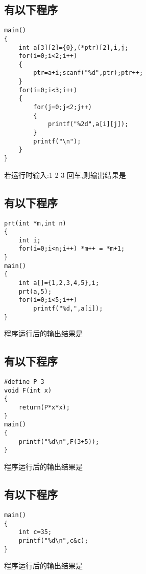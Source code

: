 ﻿\documentclass  [11pt,twocolumn]{article}
\begin{document}

\subsection{有以下程序}
\begin{lstlisting}
main() 
{ 
    int a[3][2]={0},(*ptr)[2],i,j; 
    for(i=0;i<2;i++) 
    {
        ptr=a+i;scanf("%d",ptr);ptr++;
    } 
    for(i=0;i<3;i++) 
    {
        for(j=0;j<2;j++)
        {
            printf("%2d",a[i][j]); 
        }
        printf("\n"); 
    }
} 
\end{lstlisting}
若运行时输入:1 2 3 回车,则输出结果是\myblank{3em}


\subsection{有以下程序}
\begin{lstlisting}
prt(int *m,int n)
{
    int i;
    for(i=0;i<n;i++) *m++ = *m+1;
}
main() 
{ 
    int a[]={1,2,3,4,5},i;
    prt(a,5);
    for(i=0;i<5;i++)
        printf("%d,",a[i]);
} 
\end{lstlisting}
程序运行后的输出结果是\myblank{3em}


\subsection{有以下程序}
\begin{lstlisting}
#define P 3 
void F(int x)
{
    return(P*x*x);
} 
main() 
{
    printf("%d\n",F(3+5));
} 
\end{lstlisting}
程序运行后的输出结果是\myblank{3em}


\subsection{有以下程序}
\begin{lstlisting}
main() 
{
    int c=35;
    printf("%d\n",c&c);
} 
\end{lstlisting}
程序运行后的输出结果是\myblank{3em}
\end{document}
